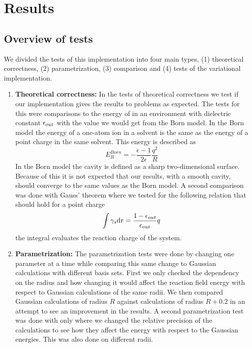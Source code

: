 \documentclass[../Thesis.tex]{subfiles}
\begin{document}
\chapter{Results}\label{chap:Results}
\section{Overview of tests}
We divided the tests of this implementation into four main types, (1) theoretical
correctness, (2) parametrization, (3) comparison and (4) tests of the variational implementation.
\begin{enumerate}

\item \textbf{Theoretical correctness:}
In the tests of theoretical correctness we test if our implementation gives the
results to problems as expected. The tests for this were comparisons to
the energy of   in an environment with dielectric constant $\epsilon_{out}$
with the value we would get from the Born model. In the Born model the energy of a  %
one-atom ion in a solvent is the same as the energy of a point charge in the same solvent.
This energy is described as \cite{Tomasi:1994wt}
\begin{equation}\label{eq:bornenergy}
  E_{R}^{Born} =-\frac{\epsilon-1}{2 \epsilon} \frac{q^{2}}{R}
\end{equation}
In the Born model the cavity is defined as a sharp two-dimensional surface. Because of this
it is not expected that our results, with a smooth cavity, should converge to the same values as
the Born model.
A second comparison was done with Gauss' theorem\cite{Sorland} where we tested for the
following relation that should hold for a point charge
\begin{equation}\label{eq:Reactioncharge}
  \int \gamma_s \text{d}r= \frac{1 - \epsilon_{out} }{\epsilon_{out}} q
\end{equation}
the integral evaluates the reaction charge of the system.

\item \textbf{Parametrization:} The parametrization tests were done by changing one parameter at a time while
comparing this same change to Gaussian calculations with different basis sets.
First we only checked the dependency on the radius and how changing it would
affect the reaction field energy with respect to Gaussian calculations of the same
radii. We then compared Gaussian calculations of radius $R$ against \mrchem
calculations of radius $R+0.2$ in an attempt to see an improvement in the
results.
A second parametrization test was done with only 
where we changed the relative precision of the \mrchem calculations to see how
they affect the energy with respect to the Gaussian energies. This was also done
on different radii.


\end{enumerate}
\end{document}
